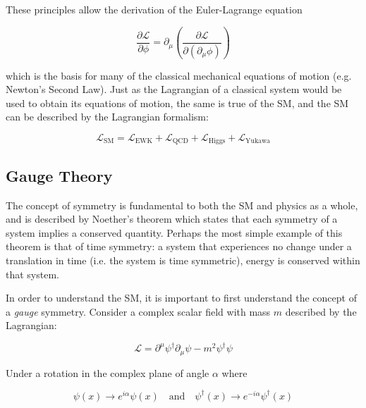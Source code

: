 \documentclass[12pt,a4paper,epsf,portrait,times,epsfig]{report}
\begin{document}
	These principles allow the derivation of the Euler-Lagrange equation

	\begin{equation}
		\frac{\partial\mathcal{L}}{\partial\phi}=\partial_{\mu}\left(\frac{\partial\mathcal{L}}{\partial(\partial_{\mu}\phi)}\right)
	\end{equation}

	which is the basis for many of the classical mechanical equations of motion (e.g. Newton's Second Law). Just as the Lagrangian of a classical system would be used to obtain its equations of motion, the same is true of the SM, and the SM can be described by the Lagrangian formalism:

	\begin{equation}
		\mathcal{L}_{\mathrm{SM}} = \mathcal{L}_{\mathrm{EWK}} + \mathcal{L}_{\mathrm{QCD}} + \mathcal{L}_{\mathrm{Higgs}} + \mathcal{L}_{\mathrm{Yukawa}}
	\end{equation}

	\subsection{Gauge Theory} \label{Section:GaugeTheory}

	The concept of symmetry is fundamental to both the SM and physics as a whole, and is described by Noether's  theorem \cite{NoetherTheoremEnglish} which states that each symmetry of a system implies a conserved quantity. Perhaps the most simple example of this theorem is that of time symmetry: a system that experiences no change under a translation in time (i.e. the system is time symmetric), energy is conserved within that system. 
	
	In order to understand the SM, it is important to first understand the concept of a \textit{gauge} symmetry. Consider a complex scalar field with mass $m$ described by the Lagrangian:

	\begin{equation}
		\mathcal{L} = \partial^{\mu} \psi^{\dagger} \partial_{\mu} \psi - m^{2}\psi^{\dagger}\psi
	\end{equation}

	Under a rotation in the complex plane of angle $\alpha$ where

	\begin{equation}
		\psi(x) \rightarrow e^{i\alpha}\psi(x)  
		\quad\mathrm{and}\quad
		\psi^{\dagger}(x) \rightarrow e^{-i\alpha}\psi^{\dagger}(x)
	\end{equation}
\end{document}
